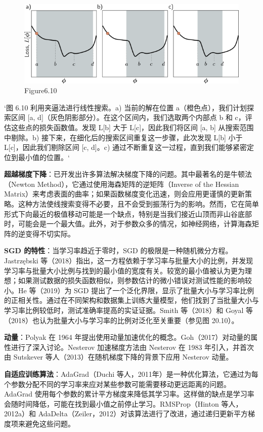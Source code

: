 \begin{figure}[ht!]
\centering
\includegraphics[width=0.7\linewidth]{png/chapter6/TrainLineSearch.png}
\caption{Figure6.10}
\end{figure}

`图 6.10 利用夹逼法进行线性搜索。a) 当前的解在位置 a（橙色点），我们计划探索区间 [a, d]（灰色阴影部分）。在这个区间内，我们选取两个内部点 b 和 c，评估这些点的损失函数值。发现 L[b] 大于 L[c]，因此我们将区间 [a, b] 从搜索范围中剔除。b) 接下来，在细化后的搜索区间重复这一步骤，此次发现 L[b] 小于 L[c]，因此我们剔除区间 [c, d]。c) 通过不断重复这一过程，直到我们能够紧密定位到最小值的位置。`

\textbf{超越梯度下降}：已开发出许多算法解决梯度下降的问题。其中最著名的是牛顿法（Newton Method），它通过使用海森矩阵的逆矩阵（Inverse of the Hessian Matrix）来考虑表面的曲率；如果函数梯度变化迅速，则会应用更谨慎的更新策略。这种方法使线搜索变得不必要，且不会受到振荡行为的影响。然而，它在简单形式下向最近的极值移动可能是一个缺点，特别是当我们接近山顶而非山谷底部时，可能会是一个最大值。此外，对于参数众多的情况，如神经网络，计算海森矩阵的逆变得不切实际。

\textbf{SGD 的特性}：当学习率趋近于零时，SGD 的极限是一种随机微分方程。Jastrzębski 等（2018）指出，这一方程依赖于学习率与批量大小的比例，并发现学习率与批量大小比例与找到的最小值的宽度有关。较宽的最小值被认为更为理想；如果测试数据的损失函数相似，则参数估计的微小错误对测试性能的影响较小。He 等（2019）为 SGD 提出了一个泛化界限，显示了批量大小与学习率比例的正相关性。通过在不同架构和数据集上训练大量模型，他们找到了当批量大小与学习率比例较低时，测试准确率提高的实证证据。Smith 等（2018）和 Goyal 等（2018）也认为批量大小与学习率的比例对泛化至关重要（参见图 20.10）。

\textbf{动量}：Polyak 在 1964 年提出使用动量加速优化的概念。Goh（2017）对动量的属性进行了深入讨论。Nesterov 加速梯度方法由 Nesterov 在 1983 年引入，并首次由 Sutskever 等人（2013）在随机梯度下降的背景下应用 Nesterov 动量。

\textbf{自适应训练算法}：AdaGrad（Duchi 等人，2011年）是一种优化算法，它通过为每个参数分配不同的学习率来应对某些参数可能需要移动更远距离的问题。AdaGrad 使用每个参数的累计平方梯度来降低其学习率。这样做的缺点是学习率会随时间降低，可能在找到最小值之前停止学习。RMSProp（Hinton 等人，2012a）和 AdaDelta（Zeiler，2012）对该算法进行了改进，通过递归更新平方梯度项来避免这些问题。

